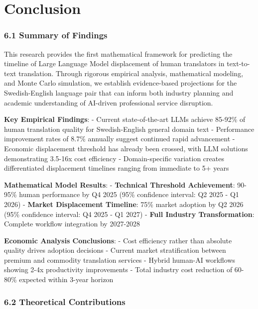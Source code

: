 \documentclass[12pt,a4paper]{article}
\begin{document}
{{{{\hypertarget{conclusion}{%
\section{Conclusion}

\hypertarget{summary-of-findings}{%
\subsubsection{6.1 Summary of Findings}\label{summary-of-findings}}

This research provides the first mathematical framework for predicting
the timeline of Large Language Model displacement of human translators
in text-to-text translation. Through rigorous empirical analysis,
mathematical modeling, and Monte Carlo simulation, we establish
evidence-based projections for the Swedish-English language pair that
can inform both industry planning and academic understanding of
AI-driven professional service disruption.

\textbf{Key Empirical Findings}: - Current state-of-the-art LLMs achieve
85-92\% of human translation quality for Swedish-English general domain
text - Performance improvement rates of 8.7\% annually suggest continued
rapid advancement - Economic displacement threshold has already been
crossed, with LLM solutions demonstrating 3.5-16x cost efficiency -
Domain-specific variation creates differentiated displacement timelines
ranging from immediate to 5+ years

\textbf{Mathematical Model Results}: - \textbf{Technical Threshold
Achievement}: 90-95\% human performance by Q4 2025 (95\% confidence
interval: Q2 2025 - Q1 2026) - \textbf{Market Displacement Timeline}:
75\% market adoption by Q2 2026 (95\% confidence interval: Q4 2025 - Q1
2027) - \textbf{Full Industry Transformation}: Complete workflow
integration by 2027-2028

\textbf{Economic Analysis Conclusions}: - Cost efficiency rather than
absolute quality drives adoption decisions - Current market
stratification between premium and commodity translation services -
Hybrid human-AI workflows showing 2-4x productivity improvements - Total
industry cost reduction of 60-80\% expected within 3-year horizon

\hypertarget{theoretical-contributions-1}{%
\subsubsection{6.2 Theoretical
Contributions}\label{theoretical-contributions-1}}

}}}}}
\end{document}
